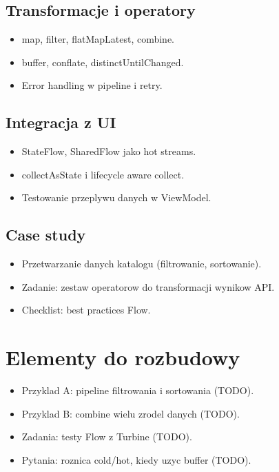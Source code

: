 \subsection{Transformacje i operatory}
\begin{itemize}
  \item map, filter, flatMapLatest, combine.
  \item buffer, conflate, distinctUntilChanged.
  \item Error handling w pipeline i retry.
\end{itemize}

\subsection{Integracja z UI}
\begin{itemize}
  \item StateFlow, SharedFlow jako hot streams.
  \item collectAsState i lifecycle aware collect.
  \item Testowanie przeplywu danych w ViewModel.
\end{itemize}

\subsection{Case study}
\begin{itemize}
  \item Przetwarzanie danych katalogu (filtrowanie, sortowanie).
  \item Zadanie: zestaw operatorow do transformacji wynikow API.
  \item Checklist: best practices Flow.
\end{itemize}

\section{Elementy do rozbudowy}
\begin{itemize}
  \item Przyklad A: pipeline filtrowania i sortowania (TODO).
  \item Przyklad B: combine wielu zrodel danych (TODO).
  \item Zadania: testy Flow z Turbine (TODO).
  \item Pytania: roznica cold/hot, kiedy uzyc buffer (TODO).
\end{itemize}

